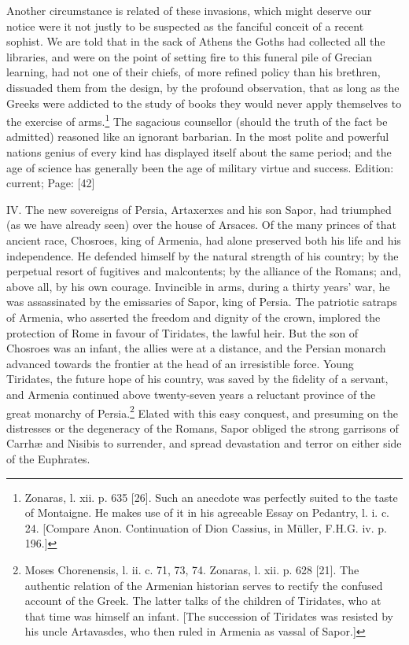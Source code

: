Another circumstance is related of these invasions, which might deserve our notice were it not justly to be suspected as the fanciful conceit of a recent sophist. We are told that in the sack of Athens the Goths had collected all the libraries, and were on the point of setting fire to this funeral pile of Grecian learning, had not one of their chiefs, of more refined policy than his brethren, dissuaded them from the design, by the profound observation, that as long as the Greeks were addicted to the study of books they would never apply themselves to the exercise of arms.\footnote{Zonaras, l. xii. p. 635 [26]. Such an anecdote was perfectly suited to the taste of Montaigne. He makes use of it in his agreeable Essay on Pedantry, l. i. c. 24. [Compare Anon. Continuation of Dion Cassius, in Müller, F.H.G. iv. p. 196.]} The sagacious counsellor (should the truth of the fact be admitted) reasoned like an ignorant barbarian. In the most polite and powerful nations genius of every kind has displayed itself about the same period; and the age of science has generally been the age of military virtue and success.
Edition: current; Page: [42]

IV. The new sovereigns of Persia, Artaxerxes and his son Sapor, had triumphed (as we have already seen) over the house of Arsaces. Of the many princes of that ancient race, Chosroes, king of Armenia, had alone preserved both his life and his independence. He defended himself by the natural strength of his country; by the perpetual resort of fugitives and malcontents; by the alliance of the Romans; and, above all, by his own courage. Invincible in arms, during a thirty years\texthebrew{}’ war, he was assassinated by the emissaries of Sapor, king of Persia. The patriotic satraps of Armenia, who asserted the freedom and dignity of the crown, implored the protection of Rome in favour of Tiridates, the lawful heir. But the son of Chosroes was an infant, the allies were at a distance, and the Persian monarch advanced towards the frontier at the head of an irresistible force. Young Tiridates, the future hope of his country, was saved by the fidelity of a servant, and Armenia continued above twenty-seven years a reluctant province of the great monarchy of Persia.\footnote{Moses Chorenensis, l. ii. c. 71, 73, 74. Zonaras, l. xii. p. 628 [21]. The authentic relation of the Armenian historian serves to rectify the confused account of the Greek. The latter talks of the children of Tiridates, who at that time was himself an infant. [The succession of Tiridates was resisted by his uncle Artavasdes, who then ruled in Armenia as vassal of Sapor.]} Elated with this easy conquest, and presuming on the distresses or the degeneracy of the Romans, Sapor obliged the strong garrisons of Carrhæ and Nisibis to surrender, and spread devastation and terror on either side of the Euphrates.

